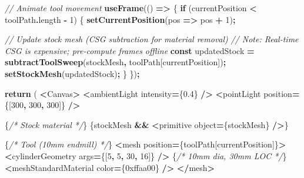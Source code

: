 \documentclass[
]{article}
\newenvironment{Shaded}{\begin{snugshade}}{\end{snugshade}}
\newcommand{\AttributeTok}[1]{\textcolor[rgb]{0.13,0.29,0.53}{#1}}
\newcommand{\BaseNTok}[1]{\textcolor[rgb]{0.00,0.00,0.81}{#1}}
\newcommand{\CommentTok}[1]{\textcolor[rgb]{0.56,0.35,0.01}{\textit{#1}}}
\newcommand{\ControlFlowTok}[1]{\textcolor[rgb]{0.13,0.29,0.53}{\textbf{#1}}}
\newcommand{\DataTypeTok}[1]{\textcolor[rgb]{0.13,0.29,0.53}{#1}}
\newcommand{\DecValTok}[1]{\textcolor[rgb]{0.00,0.00,0.81}{#1}}
\newcommand{\FloatTok}[1]{\textcolor[rgb]{0.00,0.00,0.81}{#1}}
\newcommand{\FunctionTok}[1]{\textcolor[rgb]{0.13,0.29,0.53}{\textbf{#1}}}
\newcommand{\KeywordTok}[1]{\textcolor[rgb]{0.13,0.29,0.53}{\textbf{#1}}}
\newcommand{\NormalTok}[1]{#1}
\newcommand{\OperatorTok}[1]{\textcolor[rgb]{0.81,0.36,0.00}{\textbf{#1}}}
\begin{document}
\begin{Shaded}
\begin{Highlighting}[]
  \CommentTok{// Animate tool movement}
  \FunctionTok{useFrame}\NormalTok{(() }\KeywordTok{=\textgreater{}}\NormalTok{ \{}
    \ControlFlowTok{if}\NormalTok{ (currentPosition }\OperatorTok{\textless{}}\NormalTok{ toolPath}\OperatorTok{.}\AttributeTok{length} \OperatorTok{{-}} \DecValTok{1}\NormalTok{) \{}
      \FunctionTok{setCurrentPosition}\NormalTok{(pos }\KeywordTok{=\textgreater{}}\NormalTok{ pos }\OperatorTok{+} \DecValTok{1}\NormalTok{)}\OperatorTok{;}

      \CommentTok{// Update stock mesh (CSG subtraction for material removal)}
      \CommentTok{// Note: Real{-}time CSG is expensive; pre{-}compute frames offline}
      \KeywordTok{const}\NormalTok{ updatedStock }\OperatorTok{=} \FunctionTok{subtractToolSweep}\NormalTok{(stockMesh}\OperatorTok{,}\NormalTok{ toolPath[currentPosition])}\OperatorTok{;}
      \FunctionTok{setStockMesh}\NormalTok{(updatedStock)}\OperatorTok{;}
\NormalTok{    \}}
\NormalTok{  \})}\OperatorTok{;}

  \ControlFlowTok{return}\NormalTok{ (}
    \OperatorTok{\textless{}}\NormalTok{Canvas}\OperatorTok{\textgreater{}}
      \OperatorTok{\textless{}}\NormalTok{ambientLight intensity}\OperatorTok{=}\NormalTok{\{}\FloatTok{0.4}\NormalTok{\} }\OperatorTok{/\textgreater{}}
      \OperatorTok{\textless{}}\NormalTok{pointLight position}\OperatorTok{=}\NormalTok{\{[}\DecValTok{300}\OperatorTok{,} \DecValTok{300}\OperatorTok{,} \DecValTok{300}\NormalTok{]\} }\OperatorTok{/\textgreater{}}

\NormalTok{      \{}\CommentTok{/* Stock material */}\NormalTok{\}}
\NormalTok{      \{stockMesh }\OperatorTok{\&\&} \OperatorTok{\textless{}}\NormalTok{primitive }\DataTypeTok{object}\OperatorTok{=}\NormalTok{\{stockMesh\} }\OperatorTok{/\textgreater{}}\NormalTok{\}}

\NormalTok{      \{}\CommentTok{/* Tool (10mm endmill) */}\NormalTok{\}}
      \OperatorTok{\textless{}}\NormalTok{mesh position}\OperatorTok{=}\NormalTok{\{toolPath[currentPosition]\}}\OperatorTok{\textgreater{}}
        \OperatorTok{\textless{}}\NormalTok{cylinderGeometry args}\OperatorTok{=}\NormalTok{\{[}\DecValTok{5}\OperatorTok{,} \DecValTok{5}\OperatorTok{,} \DecValTok{30}\OperatorTok{,} \DecValTok{16}\NormalTok{]\} }\OperatorTok{/\textgreater{}}\NormalTok{  \{}\CommentTok{/* 10mm dia, 30mm LOC */}\NormalTok{\}}
        \OperatorTok{\textless{}}\NormalTok{meshStandardMaterial color}\OperatorTok{=}\NormalTok{\{}\BaseNTok{0xffaa00}\NormalTok{\} }\OperatorTok{/\textgreater{}}
      \OperatorTok{\textless{}/}\NormalTok{mesh}\OperatorTok{\textgreater{}}


\end{Highlighting}
\end{Shaded}
\end{document}
